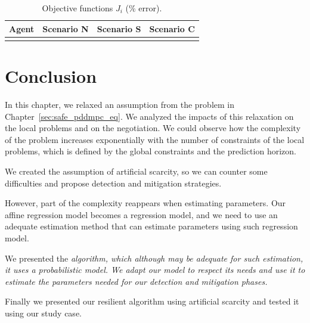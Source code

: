 \documentclass[../main.tex]{subfiles}
\begin{document}
\begin{table}[h]
  \centering
  \caption{Objective functions $J_{i}$ (\% error).}\label{tab:costsGlobalLocal}
  \begin{tabular}[t]{cccc}
    \toprule
    Agent  & Scenario N& Scenario S & Scenario C\\
    \midrule
    \\
    \bottomrule
  \end{tabular}
\end{table}

\section{Conclusion}\label{sec:conclusion}
In this chapter, we relaxed an assumption from the problem in Chapter~\ref{sec:safe_pddmpc_eq}. We analyzed the impacts of this relaxation on the local problems and on the negotiation.
We could observe how the complexity of the problem increases exponentially with the number of constraints of the local problems, which is defined by the global constraints and the prediction horizon.

We created the assumption of artificial scarcity, so we can counter some difficulties and propose detection and mitigation strategies.

However, part of the complexity reappears when estimating parameters.
Our affine regression model becomes a \pwa{} regression model, and we need to use an adequate estimation method that can estimate parameters using such regression model.

We presented the \em{} algorithm,  which although may be adequate for such estimation, it uses a probabilistic model. We adapt our model to respect its needs and use it to estimate the parameters needed for our detection and mitigation phases.

Finally we presented our resilient algorithm using artificial scarcity and tested it using our \dhn{} study case.

\end{document}
